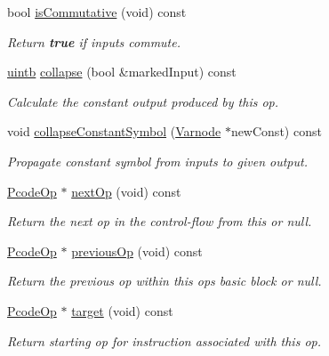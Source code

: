 \begin{DoxyCompactItemize}
bool \mbox{\hyperlink{class_pcode_op_ab71ae5150df21c23ffcc6638d925d224}{is\+Commutative}} (void) const
\begin{DoxyCompactList}\small\item\em Return {\bfseries{true}} if inputs commute. \end{DoxyCompactList}\item 
\mbox{\hyperlink{types_8h_a2db313c5d32a12b01d26ac9b3bca178f}{uintb}} \mbox{\hyperlink{class_pcode_op_a6fd640f1b530d2a3a6aa330f7bde7dfe}{collapse}} (bool \&marked\+Input) const
\begin{DoxyCompactList}\small\item\em Calculate the constant output produced by this op. \end{DoxyCompactList}\item 
void \mbox{\hyperlink{class_pcode_op_a84d465c2dc9db2670ebfbf1cb148944c}{collapse\+Constant\+Symbol}} (\mbox{\hyperlink{class_varnode}{Varnode}} $\ast$new\+Const) const
\begin{DoxyCompactList}\small\item\em Propagate constant symbol from inputs to given output. \end{DoxyCompactList}\item 
\mbox{\hyperlink{class_pcode_op}{Pcode\+Op}} $\ast$ \mbox{\hyperlink{class_pcode_op_a6d5fd39f58bea087491f7d86250b0165}{next\+Op}} (void) const
\begin{DoxyCompactList}\small\item\em Return the next op in the control-\/flow from this or {\itshape null}. \end{DoxyCompactList}\item 
\mbox{\hyperlink{class_pcode_op}{Pcode\+Op}} $\ast$ \mbox{\hyperlink{class_pcode_op_a2d0518b850450346c635f9d04725be5e}{previous\+Op}} (void) const
\begin{DoxyCompactList}\small\item\em Return the previous op within this op\textquotesingle{}s basic block or {\itshape null}. \end{DoxyCompactList}\item 
\mbox{\hyperlink{class_pcode_op}{Pcode\+Op}} $\ast$ \mbox{\hyperlink{class_pcode_op_a18784de8c95d9011522302a8ba3647b3}{target}} (void) const
\begin{DoxyCompactList}\small\item\em Return starting op for instruction associated with this op. \end{DoxyCompactList}\item 

\end{DoxyCompactItemize}
